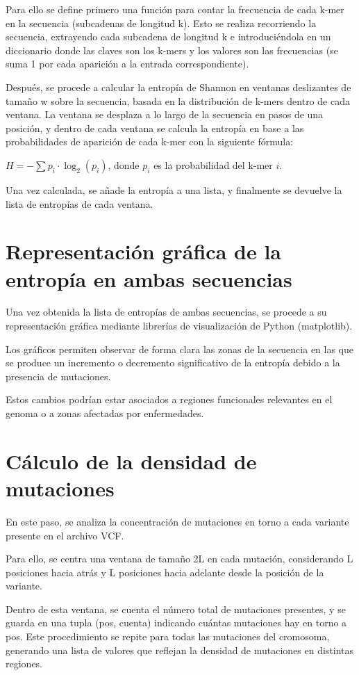 \documentclass[11pt,spanish,listoffigures,listoftables]{tfgetsinf}
\begin{document}
Para ello se define primero una función para contar la frecuencia de cada k-mer en la secuencia (subcadenas de longitud k). Esto se realiza recorriendo la secuencia, extrayendo cada subcadena de longitud k e introduciéndola en un diccionario donde las claves son los k-mers y los valores son las frecuencias (se suma 1 por cada aparición a la entrada correspondiente).  

Después, se procede a calcular la entropía de Shannon en ventanas deslizantes de tamaño w sobre la secuencia, basada en la distribución de k-mers dentro de cada ventana. La ventana se desplaza a lo largo de la secuencia en pasos de una posición, y dentro de cada ventana se calcula la entropía en base a las probabilidades de aparición de cada k-mer con la siguiente fórmula: 

$H = -\sum p_i \cdot \log_2(p_i)$, donde $p_i$ es la probabilidad del k-mer $i$.

Una vez calculada, se añade la entropía a una lista, y finalmente se devuelve la lista de entropías de cada ventana. 

\section{Representación gráfica de la entropía en ambas secuencias}

Una vez obtenida la lista de entropías de ambas secuencias, se procede a su representación gráfica mediante librerías de visualización de Python (matplotlib). 

Los gráficos permiten observar de forma clara las zonas de la secuencia en las que se produce un incremento o decremento significativo de la entropía debido a la presencia de mutaciones. 

Estos cambios podrían estar asociados a regiones funcionales relevantes en el genoma o a zonas afectadas por enfermedades. 

\section{Cálculo de la densidad de mutaciones}

En este paso, se analiza la concentración de mutaciones en torno a cada variante presente en el archivo VCF. 

Para ello, se centra una ventana de tamaño 2L en cada mutación, considerando L posiciones hacia atrás y L posiciones hacia adelante desde la posición de la variante. 

Dentro de esta ventana, se cuenta el número total de mutaciones presentes, y se guarda en una tupla (pos, cuenta) indicando cuántas mutaciones hay en torno a pos. Este procedimiento se repite para todas las mutaciones del cromosoma, generando una lista de valores que reflejan la densidad de mutaciones en distintas regiones. 
\end{document}
